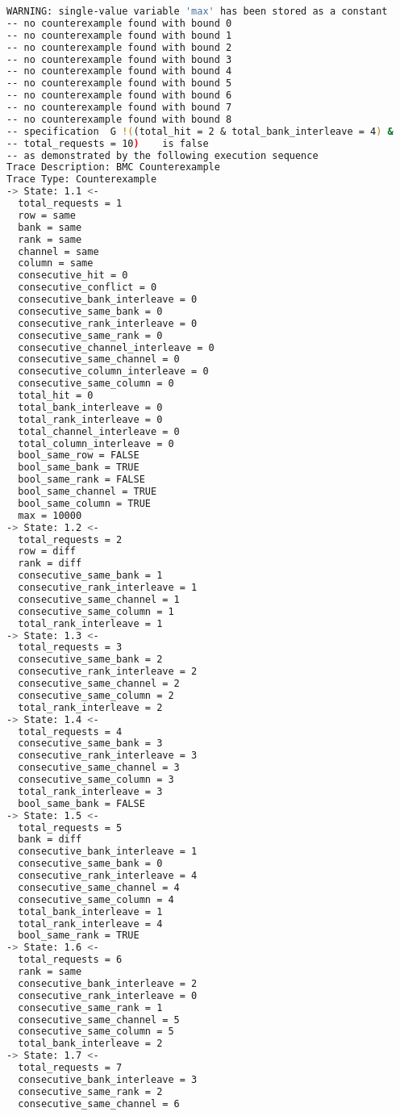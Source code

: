 \begin{lstlisting}[language=bash]
WARNING: single-value variable 'max' has been stored as a constant
-- no counterexample found with bound 0
-- no counterexample found with bound 1
-- no counterexample found with bound 2
-- no counterexample found with bound 3
-- no counterexample found with bound 4
-- no counterexample found with bound 5
-- no counterexample found with bound 6
-- no counterexample found with bound 7
-- no counterexample found with bound 8
-- specification  G !((total_hit = 2 & total_bank_interleave = 4) &
-- total_requests = 10)    is false
-- as demonstrated by the following execution sequence
Trace Description: BMC Counterexample 
Trace Type: Counterexample 
-> State: 1.1 <-
  total_requests = 1
  row = same
  bank = same
  rank = same
  channel = same
  column = same
  consecutive_hit = 0
  consecutive_conflict = 0
  consecutive_bank_interleave = 0
  consecutive_same_bank = 0
  consecutive_rank_interleave = 0
  consecutive_same_rank = 0
  consecutive_channel_interleave = 0
  consecutive_same_channel = 0
  consecutive_column_interleave = 0
  consecutive_same_column = 0
  total_hit = 0
  total_bank_interleave = 0
  total_rank_interleave = 0
  total_channel_interleave = 0
  total_column_interleave = 0
  bool_same_row = FALSE
  bool_same_bank = TRUE
  bool_same_rank = FALSE
  bool_same_channel = TRUE
  bool_same_column = TRUE
  max = 10000
-> State: 1.2 <-
  total_requests = 2
  row = diff
  rank = diff
  consecutive_same_bank = 1
  consecutive_rank_interleave = 1
  consecutive_same_channel = 1
  consecutive_same_column = 1
  total_rank_interleave = 1
-> State: 1.3 <-
  total_requests = 3
  consecutive_same_bank = 2
  consecutive_rank_interleave = 2
  consecutive_same_channel = 2
  consecutive_same_column = 2
  total_rank_interleave = 2
-> State: 1.4 <-
  total_requests = 4
  consecutive_same_bank = 3
  consecutive_rank_interleave = 3
  consecutive_same_channel = 3
  consecutive_same_column = 3
  total_rank_interleave = 3
  bool_same_bank = FALSE
-> State: 1.5 <-
  total_requests = 5
  bank = diff
  consecutive_bank_interleave = 1
  consecutive_same_bank = 0
  consecutive_rank_interleave = 4
  consecutive_same_channel = 4
  consecutive_same_column = 4
  total_bank_interleave = 1
  total_rank_interleave = 4
  bool_same_rank = TRUE
-> State: 1.6 <-
  total_requests = 6
  rank = same
  consecutive_bank_interleave = 2
  consecutive_rank_interleave = 0
  consecutive_same_rank = 1
  consecutive_same_channel = 5
  consecutive_same_column = 5
  total_bank_interleave = 2
-> State: 1.7 <-
  total_requests = 7
  consecutive_bank_interleave = 3
  consecutive_same_rank = 2
  consecutive_same_channel = 6

\end{lstlisting}

